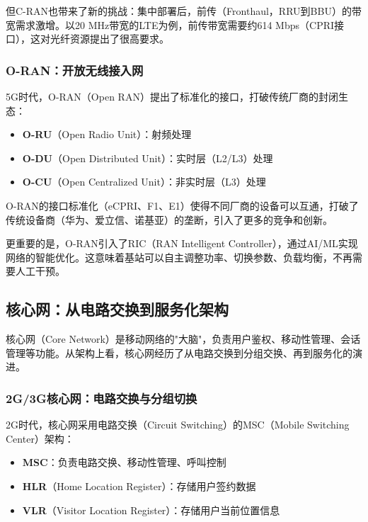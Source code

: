 但C-RAN也带来了新的挑战：集中部署后，前传（Fronthaul，RRU到BBU）的带宽需求激增。以20 MHz带宽的LTE为例，前传带宽需要约614 Mbps（CPRI接口），这对光纤资源提出了很高要求。

\subsubsection{O-RAN：开放无线接入网}

5G时代，O-RAN（Open RAN）提出了标准化的接口，打破传统厂商的封闭生态：

\begin{itemize}
    \item \textbf{O-RU}（Open Radio Unit）：射频处理
    \item \textbf{O-DU}（Open Distributed Unit）：实时层（L2/L3）处理
    \item \textbf{O-CU}（Open Centralized Unit）：非实时层（L3）处理
\end{itemize}

O-RAN的接口标准化（eCPRI、F1、E1）使得不同厂商的设备可以互通，打破了传统设备商（华为、爱立信、诺基亚）的垄断，引入了更多的竞争和创新。

更重要的是，O-RAN引入了RIC（RAN Intelligent Controller），通过AI/ML实现网络的智能优化。这意味着基站可以自主调整功率、切换参数、负载均衡，不再需要人工干预。

\subsection{核心网：从电路交换到服务化架构}

核心网（Core Network）是移动网络的"大脑"，负责用户鉴权、移动性管理、会话管理等功能。从架构上看，核心网经历了从电路交换到分组交换、再到服务化的演进。

\subsubsection{2G/3G核心网：电路交换与分组切换}

2G时代，核心网采用电路交换（Circuit Switching）的MSC（Mobile Switching Center）架构：

\begin{itemize}
    \item \textbf{MSC}：负责电路交换、移动性管理、呼叫控制
    \item \textbf{HLR}（Home Location Register）：存储用户签约数据
    \item \textbf{VLR}（Visitor Location Register）：存储用户当前位置信息
\end{itemize}

